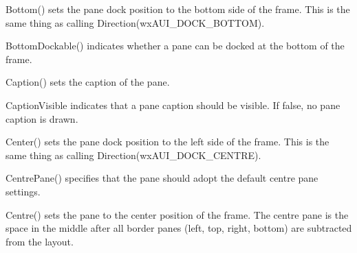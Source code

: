 \label{wxauipaneinfobottom}


Bottom() sets the pane dock position to the bottom side of the frame.  This is
the same thing as calling Direction(wxAUI\_DOCK\_BOTTOM).

\label{wxauipaneinfobottomdockable}


BottomDockable() indicates whether a pane can be docked at the bottom of the frame.

\label{wxauipaneinfocaption}


Caption() sets the caption of the pane.

\label{wxauipaneinfocaptionvisible}


CaptionVisible indicates that a pane caption should be visible.  If false, no pane caption is drawn.

\label{wxauipaneinfocentre}


Center() sets the pane dock position to the left side of the frame.  This is
the same thing as calling Direction(wxAUI\_DOCK\_CENTRE).

\label{wxauipaneinfocentrepane}


CentrePane() specifies that the pane should adopt the default centre pane settings.

\label{wxauipaneinfocentre}


Centre() sets the pane to the center position of the frame.  The centre pane is the space in the middle after all border panes (left, top, right, bottom) are subtracted from the layout.

\label{wxauipaneinfocentrepane}


